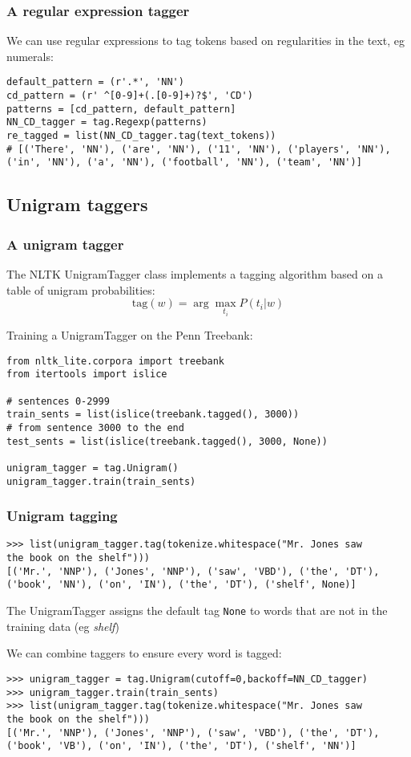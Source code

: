 \documentclass{beamer}
\begin{document}
\begin{frame}[fragile]
  \frametitle{A regular expression tagger}
We can use regular expressions to tag tokens based on regularities in
the text, eg numerals:

{\small
\begin{verbatim}
default_pattern = (r'.*', 'NN')
cd_pattern = (r' ^[0-9]+(.[0-9]+)?$', 'CD')
patterns = [cd_pattern, default_pattern]
NN_CD_tagger = tag.Regexp(patterns)
re_tagged = list(NN_CD_tagger.tag(text_tokens))
# [('There', 'NN'), ('are', 'NN'), ('11', 'NN'), ('players', 'NN'), 
('in', 'NN'), ('a', 'NN'), ('football', 'NN'), ('team', 'NN')]
\end{verbatim}
}%
\end{frame}



\subsection{Unigram taggers} 

\begin{frame}[fragile]
  \frametitle{A unigram tagger}
The NLTK UnigramTagger class implements a tagging algorithm based on a
table of unigram probabilities:
\[ \mbox{tag}(w) = \arg\max_{t_i} P(t_i|w) \]

\pause
Training a UnigramTagger on the Penn Treebank:
{\small
\begin{verbatim}
from nltk_lite.corpora import treebank
from itertools import islice

# sentences 0-2999
train_sents = list(islice(treebank.tagged(), 3000))
# from sentence 3000 to the end
test_sents = list(islice(treebank.tagged(), 3000, None))

unigram_tagger = tag.Unigram()
unigram_tagger.train(train_sents)
\end{verbatim}}
\end{frame}



\begin{frame}[fragile]
  \frametitle{Unigram tagging}
{\small
\begin{verbatim}
>>> list(unigram_tagger.tag(tokenize.whitespace("Mr. Jones saw 
the book on the shelf")))
[('Mr.', 'NNP'), ('Jones', 'NNP'), ('saw', 'VBD'), ('the', 'DT'), 
('book', 'NN'), ('on', 'IN'), ('the', 'DT'), ('shelf', None)]
\end{verbatim}}

  The UnigramTagger assigns the default tag \texttt{None} to words
  that are not in the training data (eg \emph{shelf})

  \pause
  We can combine taggers to ensure every word is tagged:
{\small
\begin{verbatim}
>>> unigram_tagger = tag.Unigram(cutoff=0,backoff=NN_CD_tagger)
>>> unigram_tagger.train(train_sents)
>>> list(unigram_tagger.tag(tokenize.whitespace("Mr. Jones saw 
the book on the shelf")))
[('Mr.', 'NNP'), ('Jones', 'NNP'), ('saw', 'VBD'), ('the', 'DT'), 
('book', 'VB'), ('on', 'IN'), ('the', 'DT'), ('shelf', 'NN')]
\end{verbatim}}
\end{frame}
\end{document}
